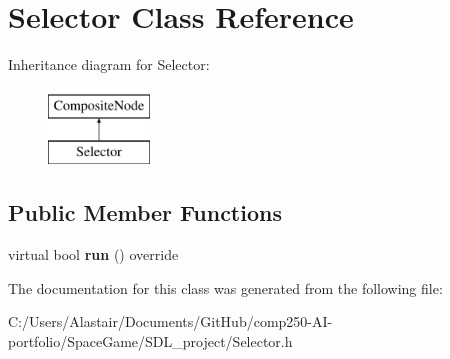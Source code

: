 \hypertarget{class_selector}{}\section{Selector Class Reference}
\label{class_selector}
Inheritance diagram for Selector\+:\begin{figure}[H]
\begin{center}
\leavevmode
\includegraphics[height=2.000000cm]{class_selector}
\end{center}
\end{figure}
\subsection*{Public Member Functions}
\begin{DoxyCompactItemize}
\item 
\mbox{\label{class_selector_a7bc8ca5615479b52488a392475411b20}} 
virtual bool {\bfseries run} () override
\end{DoxyCompactItemize}


The documentation for this class was generated from the following file\+:\begin{DoxyCompactItemize}
\item 
C\+:/\+Users/\+Alastair/\+Documents/\+Git\+Hub/comp250-\/\+A\+I-\/portfolio/\+Space\+Game/\+S\+D\+L\+\_\+project/Selector.\+h\end{DoxyCompactItemize}
